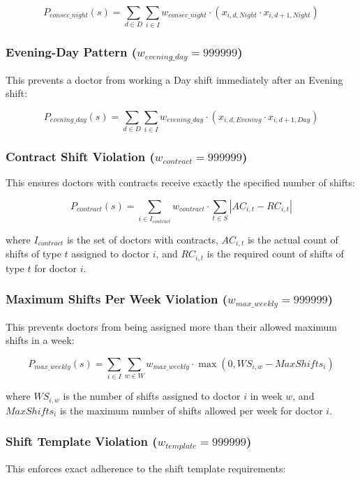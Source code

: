 \documentclass[12pt]{article}
\begin{document}
\begin{equation}
P_{consec\_night}(s) = \sum_{d \in D} \sum_{i \in I} w_{consec\_night} \cdot (x_{i,d,Night} \cdot x_{i,d+1,Night})
\end{equation}

\subsubsection{Evening-Day Pattern ($w_{evening\_day} = 999999$)}
This prevents a doctor from working a Day shift immediately after an Evening shift:

\begin{equation}
P_{evening\_day}(s) = \sum_{d \in D} \sum_{i \in I} w_{evening\_day} \cdot (x_{i,d,Evening} \cdot x_{i,d+1,Day})
\end{equation}

\subsubsection{Contract Shift Violation ($w_{contract} = 999999$)}
This ensures doctors with contracts receive exactly the specified number of shifts:

\begin{equation}
P_{contract}(s) = \sum_{i \in I_{contract}} w_{contract} \cdot \sum_{t \in S} |AC_{i,t} - RC_{i,t}|
\end{equation}

where $I_{contract}$ is the set of doctors with contracts, $AC_{i,t}$ is the actual count of shifts of type $t$ assigned to doctor $i$, and $RC_{i,t}$ is the required count of shifts of type $t$ for doctor $i$.

\subsubsection{Maximum Shifts Per Week Violation ($w_{max\_weekly} = 999999$)}
This prevents doctors from being assigned more than their allowed maximum shifts in a week:

\begin{equation}
P_{max\_weekly}(s) = \sum_{i \in I} \sum_{w \in W} w_{max\_weekly} \cdot \max(0, WS_{i,w} - MaxShifts_i)
\end{equation}

where $WS_{i,w}$ is the number of shifts assigned to doctor $i$ in week $w$, and $MaxShifts_i$ is the maximum number of shifts allowed per week for doctor $i$.

\subsubsection{Shift Template Violation ($w_{template} = 999999$)}
This enforces exact adherence to the shift template requirements:
\end{document}
